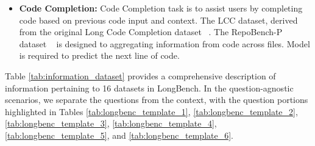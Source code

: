 \begin{itemize}
	
	\item \textbf{Code Completion:} Code Completion task is to assist users by completing code based on previous code input and context. The LCC dataset, derived from the original Long Code Completion dataset ~\citep{guo2023longcoder}. The RepoBench-P dataset ~\citep{liu2023repobench} is designed to aggregating information from code across files. Model is required to predict the next line of code.
	
	
	
	
	
\end{itemize}



Table \ref{tab:information_dataset} provides a comprehensive description of information pertaining to 16 datasets in LongBench. In the question-agnostic scenarios, we separate the questions from the context, with the question portions highlighted in Tables \ref{tab:longbenc_template_1}, \ref{tab:longbenc_template_2}, \ref{tab:longbenc_template_3}, \ref{tab:longbenc_template_4}, \ref{tab:longbenc_template_5}, and \ref{tab:longbenc_template_6}.













